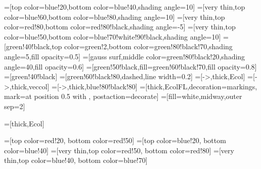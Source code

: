 \usepackage{xcolor}
=[top color=blue!20,bottom color=blue!40,shading angle=10]
=[very thin,top color=blue!60,bottom color=blue!80,shading angle=10]
=[very thin,top color=red!80,bottom color=red!80!black,shading angle=-5]
=[very thin,top color=blue!50,bottom color=blue!70!white!90!black,shading angle=10]
=[green!40!black,top color=green!2,bottom color=green!80!black!70,shading angle=5,fill opacity=0.5]
=[gauss surf,middle color=green!80!black!20,shading angle=40,fill opacity=0.6]
=[green!50!black,fill=green!60!black!70,fill opacity=0.8]
=[green!40!black]
=[green!60!black!80,dashed,line width=0.2]
=[->,thick,Ecol]
=[->,thick,veccol]
=[->,thick,blue!80!black!80]
=[thick,EcolFL,decoration={markings,
          mark=at position 0.5 with {}},
          postaction={decorate}]
=[fill=white,midway,outer sep=2]



\usepackage{amsmath} %
\usepackage{physics}
\usepackage{tikz,pgfplots}
\usetikzlibrary{angles,quotes} %
\usetikzlibrary{decorations.markings}
\tikzset{>=latex} %
\usepackage{xcolor}
=[thick,Ecol]


\usepackage{tikz-3dplot}

\usepackage{mathtools}
\usetikzlibrary{decorations.markings}

=[top color=red!20, bottom color=red!50]
=[top color=blue!20, bottom color=blue!40]
=[very thin,top color=red!50, bottom color=red!80]
=[very thin,top color=blue!40, bottom color=blue!70]


